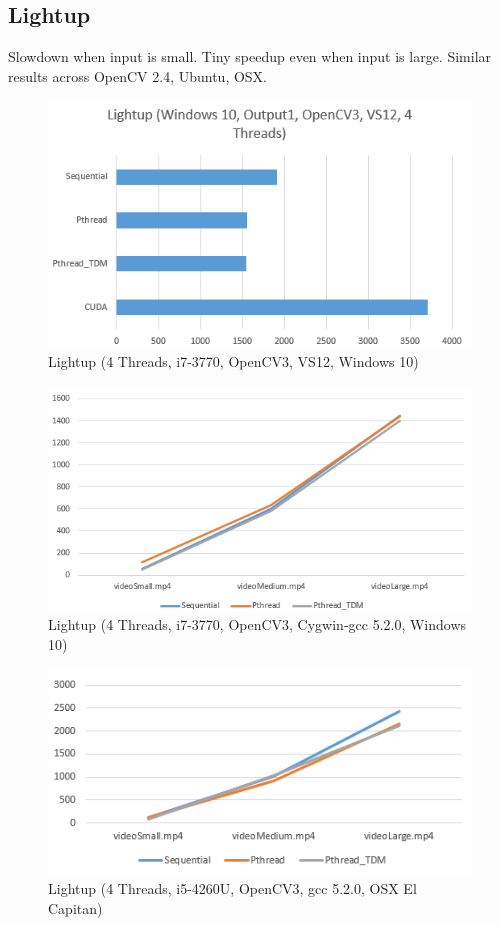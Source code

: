 \documentclass{acm_proc_article-sp}
\begin{document}
\subsection{Lightup}
Slowdown when input is small. Tiny speedup even when input is large. Similar results across OpenCV 2.4, Ubuntu, OSX.
\begin{figure}[H]
  \includegraphics[width=\linewidth,natwidth=526,natheight=307]{lightup.png}
  \caption{Lightup (4 Threads, i7-3770, OpenCV3, VS12, Windows 10)}
  \label{fig:lightup}
\end{figure}
\begin{figure}[H]
  \includegraphics[width=\linewidth,natwidth=579,natheight=307]{lightup_sml.png}
  \caption{Lightup (4 Threads, i7-3770, OpenCV3, Cygwin-gcc 5.2.0, Windows 10)}
  \label{fig:lightup_sml}
\end{figure}
\begin{figure}[H]
  \includegraphics[width=\linewidth,natwidth=475,natheight=231]{lightup_osx.png}
  \caption{Lightup (4 Threads, i5-4260U, OpenCV3, gcc 5.2.0, OSX El Capitan)}
  \label{fig:lightup_osx}
\end{figure}
\end{document}
